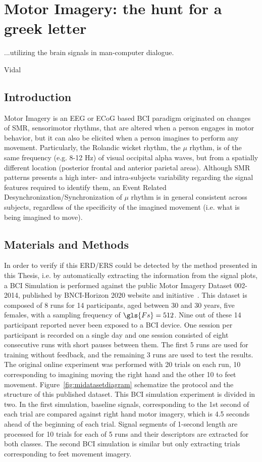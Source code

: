 \chapter{Motor Imagery: the hunt for a greek letter}
\label{chapter:five}
\epigraph{...utilizing the brain signals in man-computer dialogue.}{Vidal}

\section{Introduction}

Motor Imagery is an EEG or ECoG based BCI paradigm originated on changes of SMR, sensorimotor rhythms, that are altered when a person engages in motor behavior, but it can also be elicited when a person imagines to perform any movement. Particularly, the Rolandic wicket rhythm, the $\mu$ rhythm, is of the same frequency (e.g. 8-12 Hz) of visual occipital alpha waves, but from a spatially different location (posterior frontal and anterior parietal areas)\cite{WolpawJonathanR2012}.   Although SMR patterns presents a high inter- and intra-subjects variability regarding the signal features required to identify them, an Event Related Desynchronization/Synchronization of $\mu$ rhythm is in general consistent across subjects, regardless of the specificity of the imagined movement (i.e. what is being imagined to move).

\section{Materials and Methods}

In order to verify if this ERD/ERS could be detected by the method presented in this Thesis, i.e. by automatically extracting the information from the signal plots, a BCI Simulation is performed against the public Motor Imagery Dataset 002-2014, published by BNCI-Horizon 2020 website and initiative~\cite{Steyrl2015}.  This dataset is composed of 8 runs for 14 participants, aged between 30 and 30 years, five females, with a sampling frequency of $\gls{Fs} = 512$. Nine out of these 14 participant reported never been exposed to a BCI device.  One session per participant is recorded on a single day and one session consisted of eight consecutive runs with short pauses between them.  The first 5 runs are used for training without feedback, and the remaining 3 runs are used to test the results.  The original online experiment was performed with 20 trials on each run, 10 corresponding to imagining moving the right hand and the other 10 to feet movement.  Figure~\ref{fig:midatasetdiagram} schematize the protocol and the structure of this published dataset.  This BCI simulation experiment is divided in two.  In the first simulation, baseline signals, corresponding to the 1st second of each trial are compared against right hand motor imagery, which is 4.5 seconds ahead of the beginning of each trial. Signal segments of 1-second length are processed for 10 trials for each of 5 runs and their descriptors are extracted for both classes.  The second BCI simulation is similar but only extracting trials corresponding to feet movement imagery.




